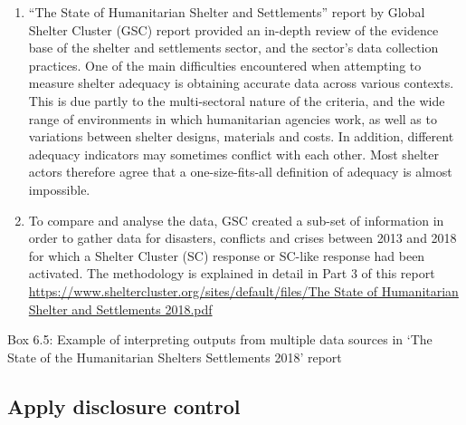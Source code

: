 \documentclass[
]{article}
\begin{document}
\begin{enumerate}
\def\labelenumi{\arabic{enumi}.}
\setcounter{enumi}{474}
\item
  ``The State of Humanitarian Shelter and Settlements'' report by
  Global Shelter Cluster (GSC) report provided an in-depth review of
  the evidence base of the shelter and settlements sector, and the
  sector's data collection practices. One of the main difficulties
  encountered when attempting to measure shelter adequacy is obtaining
  accurate data across various contexts. This is due partly to the
  multi-sectoral nature of the criteria, and the wide range of
  environments in which humanitarian agencies work, as well as to
  variations between shelter designs, materials and costs. In
  addition, different adequacy indicators may sometimes conflict with
  each other. Most shelter actors therefore agree that a
  one-size-fits-all definition of adequacy is almost impossible.
\item
  To compare and analyse the data, GSC created a sub-set of
  information in order to gather data for disasters, conflicts and
  crises between 2013 and 2018 for which a Shelter Cluster (SC)
  response or SC-like response had been activated. The methodology is
  explained in detail in Part 3 of this report
  \href{https://www.sheltercluster.org/sites/default/files/The\%20State\%20of\%20Humanitarian\%20Shelter\%20and\%20Settlements\%202018.pdf}{https://www.sheltercluster.org/sites/default/files/The State of
  Humanitarian Shelter and Settlements
  2018.pdf}
\end{enumerate}

Box 6.5: Example of interpreting outputs from multiple data sources in
`The State of the Humanitarian Shelters Settlements 2018' report

\hypertarget{apply-disclosure-control}{%
\subsection{Apply disclosure control}\label{apply-disclosure-control}}
\end{document}
